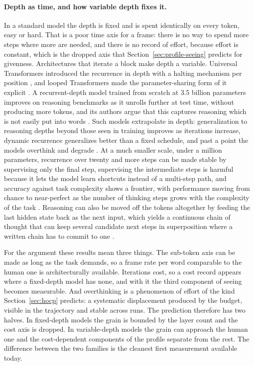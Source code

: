 \paragraph{Depth as time, and how variable depth fixes it.}
\label{sec:depthtime}
In a standard model the depth is fixed and is spent identically on every token, easy or hard. That is a
poor time axis for a frame: there is no way to spend more steps where more are needed, and there is no
record of effort, because effort is constant, which is the dropped axis that
Section~\ref{sec:profile-seeing} predicts for givenness. Architectures that iterate a block make depth
a variable. Universal Transformers introduced the recurrence in depth with a halting mechanism per
position \citep{dehghani2019}, and looped Transformers made the parameter-sharing form of it explicit
\citep{giannou2023}. A recurrent-depth model trained from scratch at 3.5 billion parameters improves on
reasoning benchmarks as it unrolls further at test time, without producing more tokens, and its
authors argue that this captures reasoning which is not easily put into words \citep{geiping2025}.
Such models extrapolate in depth: generalization to reasoning depths beyond those seen in training
improves as iterations increase, dynamic recurrence generalizes better than a fixed schedule, and past
a point the models overthink and degrade \citep{kohli2026}. At a much smaller scale, under a million
parameters, recurrence over twenty and more steps can be made stable by supervising only the final
step, supervising the intermediate steps is harmful because it lets the model learn shortcuts instead
of a multi-step path, and accuracy against task complexity shows a frontier, with performance moving
from chance to near-perfect as the number of thinking steps grows with the complexity of the task
\citep{chen2026}. Reasoning can also be moved off the tokens altogether by feeding the last hidden
state back as the next input, which yields a continuous chain of thought that can keep several
candidate next steps in superposition where a written chain has to commit to one \citep{hao2024}.

For the argument these results mean three things. The sub-token axis can be made as long as the task
demands, so a frame rate per word comparable to the human one is architecturally available. Iterations
cost, so a cost record appears where a fixed-depth model has none, and with it the third component of
seeing becomes measurable. And overthinking is a phenomenon of effort of the kind
Section~\ref{sec:hocp} predicts: a systematic displacement produced by the budget, visible in the
trajectory and stable across runs. The prediction therefore has two halves. In fixed-depth models the
grain is bounded by the layer count and the cost axis is dropped. In variable-depth models the grain can
approach the human one and the cost-dependent components of the profile separate from the rest. The
difference between the two families is the cleanest first measurement available today.

